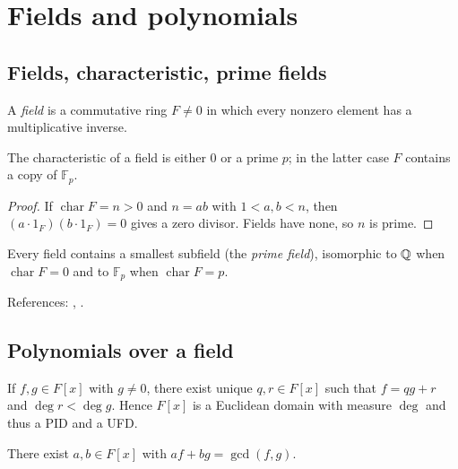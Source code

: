 \section{Fields and polynomials}\label{sec:fields-polynomials}

\subsection{Fields, characteristic, prime fields}
\begin{definition}
A \emph{field} is a commutative ring $F\neq 0$ in which every nonzero element has a multiplicative inverse.
\end{definition}
\begin{proposition}[Characteristic]\label{prop:char}
The characteristic of a field is either $0$ or a prime $p$; in the latter case $F$ contains a copy of $\mathbb{F}_p$.
\end{proposition}
\begin{proof}
If $\operatorname{char}F=n>0$ and $n=ab$ with $1<a,b<n$, then $(a\cdot1_F)(b\cdot1_F)=0$ gives a zero divisor. Fields have none, so $n$ is prime.
\end{proof}
\begin{proposition}
Every field contains a smallest subfield (the \emph{prime field}), isomorphic to $\mathbb{Q}$ when $\operatorname{char}F=0$ and to $\mathbb{F}_p$ when $\operatorname{char}F=p$.
\end{proposition}
References: \cite[\S13]{DF}, \cite[Ch.~I]{Artin}.

\subsection{Polynomials over a field}
\begin{proposition}\label{prop:division}
If $f,g\in F[x]$ with $g\neq0$, there exist unique $q,r\in F[x]$ such that $f=qg+r$ and $\deg r<\deg g$. Hence $F[x]$ is a Euclidean domain with measure $\deg$ and thus a PID and a UFD.
\end{proposition}
\begin{corollary}
There exist $a,b\in F[x]$ with $a f + b g = \gcd(f,g)$.
\end{corollary}

